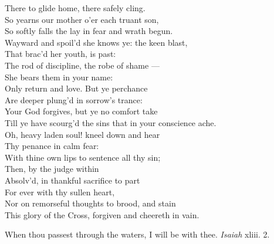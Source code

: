  There to glide home, there safely cling. \\
 So yearns our mother o’er each truant son, \\
 So softly falls the lay in fear and wrath begun. \\
  Wayward and spoil’d she knows ye: the keen blast, \\
 That brac’d her youth, is past: \\
 The rod of discipline, the robe of shame — \\
 She bears them in your name: \\
 Only return and love. But ye perchance \\
 Are deeper plung’d in sorrow’s trance: \\
 Your God forgives, but ye no comfort take \\
 Till ye have scourg’d the sins that in your conscience ache. \\
  Oh, heavy laden soul! kneel down and hear \\
 Thy penance in calm fear: \\
 With thine own lips to sentence all thy sin; \\
 Then, by the judge within \\
 Absolv’d, in thankful sacrifice to part \\
 For ever with thy sullen heart, \\
 Nor on remorseful thoughts to brood, and stain \\
 This glory of the Cross, forgiven and cheereth in vain.\\


When thou passest through the waters, I will be with thee. \emph{Isaiah} xliii. 2.


